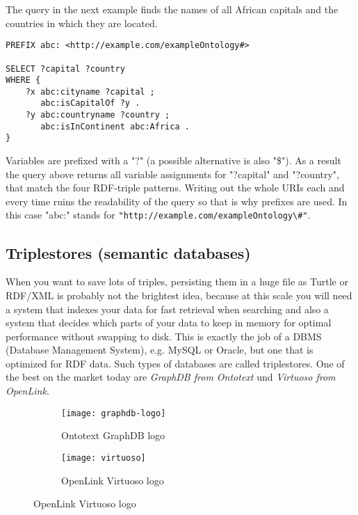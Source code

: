 The query in the next example finds the names of all African capitals and the countries in which they are located.

\begin{verbatim}
PREFIX abc: <http://example.com/exampleOntology#>

SELECT ?capital ?country
WHERE {
    ?x abc:cityname ?capital ;
       abc:isCapitalOf ?y .
    ?y abc:countryname ?country ;
       abc:isInContinent abc:Africa .
}
\end{verbatim}

Variables are prefixed with a "?" (a possible alternative is also "\$"). As a result the query above returns all variable assignments for "?capital" and "?country", that match the four RDF-triple patterns. Writing out the whole URIs each and every time ruins the readability of the query so that is why prefixes are used. In this case "abc:" stands for \verb|"http://example.com/exampleOntology\#"|.

\subsection{Triplestores (semantic databases)}
When you want to save lots of triples, persisting them in a huge file as Turtle or RDF/XML is probably not the brightest idea, because at this scale you will need a system that indexes your data for fast retrieval when searching and also a system that decides which parts of your data to keep in memory for optimal performance without swapping to disk.
This is exactly the job of a DBMS (Database Management System), e.g. MySQL or Oracle, but one that is optimized for RDF data. Such types of databases are called triplestores. One of the best on the market today are \textit{GraphDB from Ontotext} und \textit{Virtuoso from OpenLink}.

\begin{figure}[h!]
    \caption{Famous triplestore logos}
    \begin{subfigure}[b]{0.5\textwidth}
        \centering
        \texttt{[image: graphdb-logo]}
        \caption{Ontotext GraphDB logo}
        \label{fig:view}
    \end{subfigure}
    \begin{subfigure}[b]{0.5\textwidth}
        \centering
        \texttt{[image: virtuoso]}
        \caption{OpenLink Virtuoso logo}
    \label{fig:view}
    \end{subfigure}
\end{figure}


